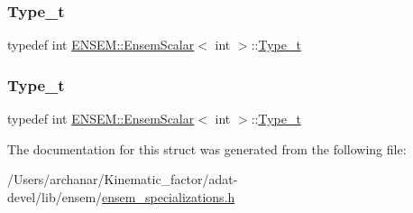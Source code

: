 \subsubsection{\texorpdfstring{Type\_t}{Type\_t}\hspace{0.1cm}{\footnotesize\ttfamily [2/3]}}
{\footnotesize\ttfamily typedef int \mbox{\hyperlink{structENSEM_1_1EnsemScalar}{E\+N\+S\+E\+M\+::\+Ensem\+Scalar}}$<$ int $>$\+::\mbox{\hyperlink{structENSEM_1_1EnsemScalar_3_01int_01_4_a41810484239c9a09218b0ca99828cd0a}{Type\+\_\+t}}}

\mbox{\label{structENSEM_1_1EnsemScalar_3_01int_01_4_a41810484239c9a09218b0ca99828cd0a}} 
\subsubsection{\texorpdfstring{Type\_t}{Type\_t}\hspace{0.1cm}{\footnotesize\ttfamily [3/3]}}
{\footnotesize\ttfamily typedef int \mbox{\hyperlink{structENSEM_1_1EnsemScalar}{E\+N\+S\+E\+M\+::\+Ensem\+Scalar}}$<$ int $>$\+::\mbox{\hyperlink{structENSEM_1_1EnsemScalar_3_01int_01_4_a41810484239c9a09218b0ca99828cd0a}{Type\+\_\+t}}}



The documentation for this struct was generated from the following file\+:\begin{DoxyCompactItemize}
\item 
/\+Users/archanar/\+Kinematic\+\_\+factor/adat-\/devel/lib/ensem/\mbox{\hyperlink{adat-devel_2lib_2ensem_2ensem__specializations_8h}{ensem\+\_\+specializations.\+h}}\end{DoxyCompactItemize}
